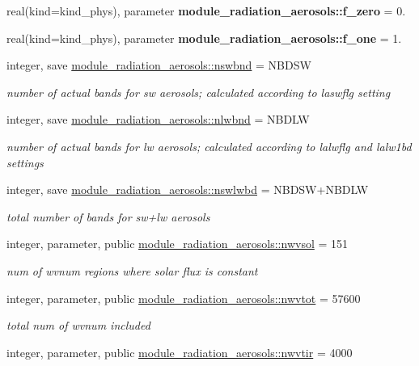 \begin{DoxyCompactItemize}
real(kind=kind\+\_\+phys), parameter {\bfseries module\+\_\+radiation\+\_\+aerosols\+::f\+\_\+zero} = 0.
\item 
real(kind=kind\+\_\+phys), parameter {\bfseries module\+\_\+radiation\+\_\+aerosols\+::f\+\_\+one} = 1.
\item 
integer, save \hyperlink{group__module__radiation__aerosols_ga1d6c41e3bb818aa8b6f8f10d1c3f38a7}{module\+\_\+radiation\+\_\+aerosols\+::nswbnd} = N\+B\+D\+SW
\begin{DoxyCompactList}\small\item\em number of actual bands for sw aerosols; calculated according to laswflg setting \end{DoxyCompactList}\item 
integer, save \hyperlink{group__module__radiation__aerosols_gab17b7f75d6d737fd2fc81eae44cba81d}{module\+\_\+radiation\+\_\+aerosols\+::nlwbnd} = N\+B\+D\+LW
\begin{DoxyCompactList}\small\item\em number of actual bands for lw aerosols; calculated according to lalwflg and lalw1bd settings \end{DoxyCompactList}\item 
integer, save \hyperlink{group__module__radiation__aerosols_gab77b3b4aa76361277d828c7ba5dc3eda}{module\+\_\+radiation\+\_\+aerosols\+::nswlwbd} = N\+B\+D\+SW+N\+B\+D\+LW
\begin{DoxyCompactList}\small\item\em total number of bands for sw+lw aerosols \end{DoxyCompactList}\item 
integer, parameter, public \hyperlink{group__module__radiation__aerosols_ga2e0dc6d161d1906050efd67c471673c9}{module\+\_\+radiation\+\_\+aerosols\+::nwvsol} = 151
\begin{DoxyCompactList}\small\item\em num of wvnum regions where solar flux is constant \end{DoxyCompactList}\item 
integer, parameter, public \hyperlink{group__module__radiation__aerosols_gae94df49c8ff8c0ec8e6b8adb891f3c6b}{module\+\_\+radiation\+\_\+aerosols\+::nwvtot} = 57600
\begin{DoxyCompactList}\small\item\em total num of wvnum included \end{DoxyCompactList}\item 
integer, parameter, public \hyperlink{group__module__radiation__aerosols_ga45b2c26ccba5d4fd2dfccf31bcc02824}{module\+\_\+radiation\+\_\+aerosols\+::nwvtir} = 4000

\end{DoxyCompactItemize}
